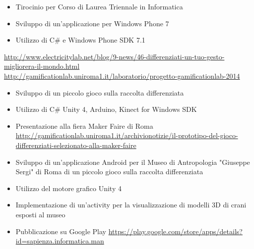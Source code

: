 \documentclass[11pt,a4paper,sans]{moderncv} %
\begin{document}
{
	\begin{itemize}
		\item Tirocinio per Corso di Laurea Triennale in Informatica
		\item Sviluppo di un'applicazione per Windows Phone 7
		\item Utilizzo di C\# e Windows Phone SDK 7.1
	\end{itemize}
}



{
	\url{http://www.electricitylab.net/blog/9-news/46-differenziati-un-tuo-gesto-migliorera-il-mondo.html}
	\newline{}
	\url{http://gamificationlab.uniroma1.it/laboratorio/progetto-gamificationlab-2014}
	\begin{itemize}
		\item Sviluppo di un piccolo gioco sulla raccolta differenziata
		\item Utilizzo di C\# Unity 4, Arduino, Kinect for Windows SDK
		\item Presentazione alla fiera Maker Faire di Roma
		\newline{} \url{http://gamificationlab.uniroma1.it/archivionotizie/il-prototipo-del-gioco-differenziati-selezionato-alla-maker-faire}
	\end{itemize}
}



{
	\begin{itemize}
		\item Sviluppo di un'applicazione Android per il Museo di Antropologia "Giuseppe Sergi" di Roma di un piccolo gioco sulla raccolta differenziata
		\item Utilizzo del motore grafico Unity 4
		\item Implementazione di un'activity per la visualizzazione di modelli 3D di crani esposti al museo
		\item Pubblicazione su Google Play
		\newline{}
		\url{https://play.google.com/store/apps/details?id=sapienza.informatica.man}
	\end{itemize}
}

\end{document}
